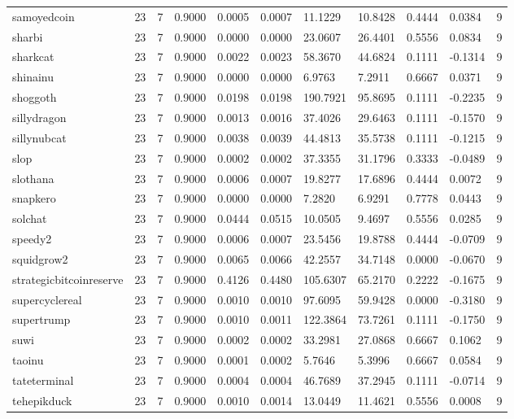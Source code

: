 \begin{table}[htbp]
\begin{tabular}{lllllllllll}
samoyedcoin & 23 & 7 & 0.9000 & 0.0005 & 0.0007 & 11.1229 & 10.8428 & 0.4444 & 0.0384 & 9 \\
sharbi & 23 & 7 & 0.9000 & 0.0000 & 0.0000 & 23.0607 & 26.4401 & 0.5556 & 0.0834 & 9 \\
sharkcat & 23 & 7 & 0.9000 & 0.0022 & 0.0023 & 58.3670 & 44.6824 & 0.1111 & -0.1314 & 9 \\
shinainu & 23 & 7 & 0.9000 & 0.0000 & 0.0000 & 6.9763 & 7.2911 & 0.6667 & 0.0371 & 9 \\
shoggoth & 23 & 7 & 0.9000 & 0.0198 & 0.0198 & 190.7921 & 95.8695 & 0.1111 & -0.2235 & 9 \\
sillydragon & 23 & 7 & 0.9000 & 0.0013 & 0.0016 & 37.4026 & 29.6463 & 0.1111 & -0.1570 & 9 \\
sillynubcat & 23 & 7 & 0.9000 & 0.0038 & 0.0039 & 44.4813 & 35.5738 & 0.1111 & -0.1215 & 9 \\
slop & 23 & 7 & 0.9000 & 0.0002 & 0.0002 & 37.3355 & 31.1796 & 0.3333 & -0.0489 & 9 \\
slothana & 23 & 7 & 0.9000 & 0.0006 & 0.0007 & 19.8277 & 17.6896 & 0.4444 & 0.0072 & 9 \\
snapkero & 23 & 7 & 0.9000 & 0.0000 & 0.0000 & 7.2820 & 6.9291 & 0.7778 & 0.0443 & 9 \\
solchat & 23 & 7 & 0.9000 & 0.0444 & 0.0515 & 10.0505 & 9.4697 & 0.5556 & 0.0285 & 9 \\
speedy2 & 23 & 7 & 0.9000 & 0.0006 & 0.0007 & 23.5456 & 19.8788 & 0.4444 & -0.0709 & 9 \\
squidgrow2 & 23 & 7 & 0.9000 & 0.0065 & 0.0066 & 42.2557 & 34.7148 & 0.0000 & -0.0670 & 9 \\
strategicbitcoinreserve & 23 & 7 & 0.9000 & 0.4126 & 0.4480 & 105.6307 & 65.2170 & 0.2222 & -0.1675 & 9 \\
supercyclereal & 23 & 7 & 0.9000 & 0.0010 & 0.0010 & 97.6095 & 59.9428 & 0.0000 & -0.3180 & 9 \\
supertrump & 23 & 7 & 0.9000 & 0.0010 & 0.0011 & 122.3864 & 73.7261 & 0.1111 & -0.1750 & 9 \\
suwi & 23 & 7 & 0.9000 & 0.0002 & 0.0002 & 33.2981 & 27.0868 & 0.6667 & 0.1062 & 9 \\
taoinu & 23 & 7 & 0.9000 & 0.0001 & 0.0002 & 5.7646 & 5.3996 & 0.6667 & 0.0584 & 9 \\
tateterminal & 23 & 7 & 0.9000 & 0.0004 & 0.0004 & 46.7689 & 37.2945 & 0.1111 & -0.0714 & 9 \\
tehepikduck & 23 & 7 & 0.9000 & 0.0010 & 0.0014 & 13.0449 & 11.4621 & 0.5556 & 0.0008 & 9 \\

\end{tabular}
\end{table}
